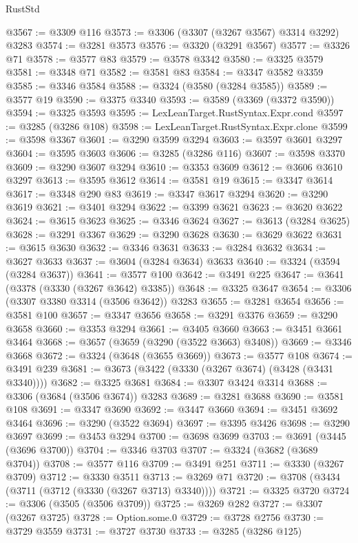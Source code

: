 \begin{lexlean}{RustStd}
\begin{coremodule}
@3567 := @3309 @116
@3573 := @3306 (@3307 (@3267 @3567) @3314 @3292) @3283
@3574 := @3281 @3573
@3576 := @3320 (@3291 @3567)
@3577 := @3326 @71
@3578 := @3577 @83
@3579 := @3578 @3342
@3580 := @3325 @3579
@3581 := @3348 @71
@3582 := @3581 @83
@3584 := @3347 @3582 @3359
@3585 := @3346 @3584
@3588 := @3324 (@3580 (@3284 @3585))
@3589 := @3577 @19
@3590 := @3375 @3340
@3593 := @3589 (@3369 (@3372 @3590))
@3594 := @3325 @3593
@3595 := LexLeanTarget.RustSyntax.Expr.cond
@3597 := @3285 (@3286 @108)
@3598 := LexLeanTarget.RustSyntax.Expr.clone
@3599 := @3598 @3367
@3601 := @3290 @3599 @3294
@3603 := @3597 @3601 @3297
@3604 := @3595 @3603
@3606 := @3285 (@3286 @116)
@3607 := @3598 @3370
@3609 := @3290 @3607 @3294
@3610 := @3353 @3609
@3612 := @3606 @3610 @3297
@3613 := @3595 @3612
@3614 := @3581 @19
@3615 := @3347 @3614
@3617 := @3348 @290 @83
@3619 := @3347 @3617 @3294
@3620 := @3290 @3619
@3621 := @3401 @3294
@3622 := @3399 @3621
@3623 := @3620 @3622
@3624 := @3615 @3623
@3625 := @3346 @3624
@3627 := @3613 (@3284 @3625)
@3628 := @3291 @3367
@3629 := @3290 @3628
@3630 := @3629 @3622
@3631 := @3615 @3630
@3632 := @3346 @3631
@3633 := @3284 @3632
@3634 := @3627 @3633
@3637 := @3604 (@3284 @3634) @3633
@3640 := @3324 (@3594 (@3284 @3637))
@3641 := @3577 @100
@3642 := @3491 @225
@3647 := @3641 (@3378 (@3330 (@3267 @3642) @3385))
@3648 := @3325 @3647
@3654 := @3306 (@3307 @3380 @3314 (@3506 @3642)) @3283
@3655 := @3281 @3654
@3656 := @3581 @100
@3657 := @3347 @3656
@3658 := @3291 @3376
@3659 := @3290 @3658
@3660 := @3353 @3294
@3661 := @3405 @3660
@3663 := @3451 @3661 @3464
@3668 := @3657 (@3659 (@3290 (@3522 @3663) @3408))
@3669 := @3346 @3668
@3672 := @3324 (@3648 (@3655 @3669))
@3673 := @3577 @108
@3674 := @3491 @239
@3681 := @3673 (@3422 (@3330 (@3267 @3674) (@3428 (@3431 @3340))))
@3682 := @3325 @3681
@3684 := @3307 @3424 @3314
@3688 := @3306 (@3684 (@3506 @3674)) @3283
@3689 := @3281 @3688
@3690 := @3581 @108
@3691 := @3347 @3690
@3692 := @3447 @3660
@3694 := @3451 @3692 @3464
@3696 := @3290 (@3522 @3694)
@3697 := @3395 @3426
@3698 := @3290 @3697
@3699 := @3453 @3294
@3700 := @3698 @3699
@3703 := @3691 (@3445 (@3696 @3700))
@3704 := @3346 @3703
@3707 := @3324 (@3682 (@3689 @3704))
@3708 := @3577 @116
@3709 := @3491 @251
@3711 := @3330 (@3267 @3709)
@3712 := @3330 @3511
@3713 := @3269 @71
@3720 := @3708 (@3434 (@3711 (@3712 (@3330 (@3267 @3713) @3340))))
@3721 := @3325 @3720
@3724 := @3306 (@3505 (@3506 @3709))
@3725 := @3269 @282
@3727 := @3307 (@3267 @3725)
@3728 := Option.some.{0}
@3729 := @3728 @2756
@3730 := @3729 @3559
@3731 := @3727 @3730
@3733 := @3285 (@3286 @125)

\end{coremodule}
\end{lexlean}

